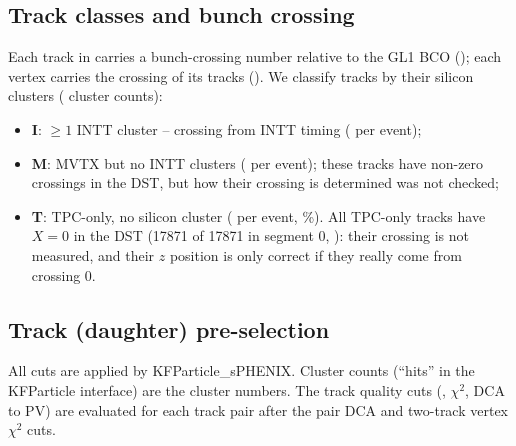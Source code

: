 \subsection{Track classes and bunch crossing}
\label{sec:trackclasses}
Each track in  carries a bunch-crossing number \Xc{} relative to the GL1 BCO
(); each vertex carries the crossing of its tracks
(). We classify tracks by their silicon clusters
( cluster counts):
\begin{itemize}\setlength\itemsep{0pt}
\item \textbf{I}: $\geq1$ INTT cluster -- crossing from INTT timing (\trkINTTPerEv{} per event);
\item \textbf{M}: MVTX but no INTT clusters (\trkMVTXonlyPerEv{} per event); these tracks have
  non-zero crossings in the DST, but how their crossing is determined was not checked;
\item \textbf{T}: TPC-only, no silicon cluster (\trkTPConlyPerEv{} per event, \trkTPConlyFrac\%).
  All TPC-only tracks have $X=0$ in the DST (17871 of 17871 in segment 0,
  ): their crossing is not measured, and their
  $z$ position is only correct if they really come from crossing 0.
\end{itemize}

\subsection{Track (daughter) pre-selection}
\label{sec:trackcuts}
All cuts are applied by KFParticle\_sPHENIX. Cluster counts (``hits'' in the KFParticle
interface) are the  cluster numbers. The track quality cuts (\pt, $\chi^2$, DCA
to PV) are evaluated for each track pair after the pair DCA and two-track vertex $\chi^2$ cuts.

